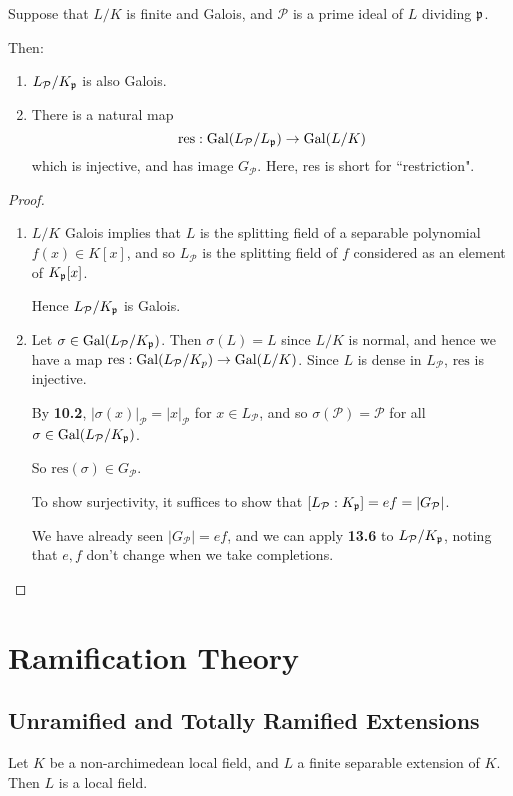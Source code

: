 \documentclass[10pt,a4paper]{article}
\begin{document}
\begin{proposition}
  Suppose that $L/K$ is finite and Galois, and $\mathcal{P}$ is a prime ideal of $L$ dividing $\mathfrak{p}$.

  Then:
  \begin{enumerate}
    \item $L_\mathcal{P} / K_{\mathfrak{p}}$ is also Galois.
    \item There is a natural map
    \[ \text{res}:\operatorname{Gal}(L_{\mathcal{P}}/L_{\mathfrak{p}}) \to \operatorname{Gal}(L/K)\]
    which is injective, and has image $G_\mathcal{P}$. Here, res is short for ``restriction".
  \end{enumerate}
\end{proposition}
\begin{proof}\hspace*{0cm}
  \begin{enumerate}
    \item $L/K$ Galois implies that $L$ is the splitting field of a separable polynomial $f(x) \in K[x]$, and so $L_\mathcal{P}$ is the splitting field of $f$ considered as an element of $K_{\mathfrak{p}}[x]$.

    Hence $L_\mathcal{P}/K_{\mathfrak{p}}$ is Galois.
    \item Let $\sigma \in \operatorname{Gal}(L_{\mathcal{P}}/K_{\mathfrak{p}})$. Then $\sigma(L) = L$ since $L/K$ is normal, and hence we have a map $\text{res}:\operatorname{Gal}(L_{\mathcal{P}}/K_p) \to \operatorname{Gal}(L/K)$. Since $L$ is dense in $L_\mathcal{P}$, $\text{res}$ is injective.

    By \textbf{10.2}, $|\sigma(x)|_\mathcal{P} = |x|_\mathcal{P}$ for $x \in L_\mathcal{P}$, and so $\sigma(\mathcal{P}) = \mathcal{P}$ for all $\sigma \in \operatorname{Gal}(L_\mathcal{P}/K_{\mathfrak{p}})$.

    So $\text{res}(\sigma) \in G_\mathcal{P}$.

    To show surjectivity, it suffices to show that $[L_\mathcal{P} : K_{\mathfrak{p}}] = ef=|G_\mathcal{P}|$.

    We have already seen $|G_\mathcal{P}| = ef$, and we can apply \textbf{13.6} to $L_\mathcal{P}/K_{\mathfrak{p}}$, noting that $e, f$ don't change when we take completions.
  \end{enumerate}
\end{proof}
\section{Ramification Theory}
\subsection{Unramified and Totally Ramified Extensions}
Let $K$ be a non-archimedean local field, and $L$ a finite separable extension of $K$. Then $L$ is a local field.
\end{document}
